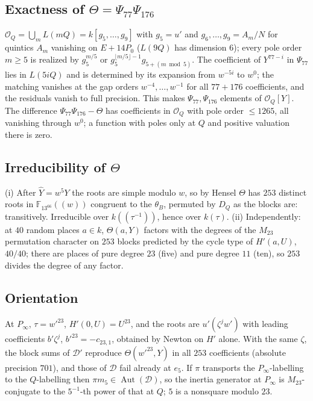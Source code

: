 \documentclass[11pt]{amsart}
\newcommand{\FF}{\mathbb{F}}
\newcommand{\Mtw}{M_{23}}
\newcommand{\Aut}{\operatorname{Aut}}
\theoremstyle{plain}
\theoremstyle{definition}
\begin{document}
\subsection*{Exactness of $\Theta=\Psi_{77}\Psi_{176}$}
$\mathcal O_Q=\bigcup_mL(mQ)=k[g_5,\dots,g_9]$ with $g_5=u'$ and
$g_6,\dots,g_9=A_m/N$ for quintics $A_m$ vanishing on $E+14P_0$
($L(9Q)$ has dimension $6$); every pole order $m\ge5$ is realized by
$g_5^{m/5}$ or $g_5^{\lfloor m/5\rfloor-1}g_{5+(m\bmod5)}$. The
coefficient of $Y^{77-i}$ in $\Psi_{77}$ lies in $L(5iQ)$ and is
determined by its expansion from $w^{-5i}$ to $w^0$; the matching
vanishes at the gap orders $w^{-4},\dots,w^{-1}$ for all $77+176$
coefficients, and the residuals vanish to full precision. This makes
$\Psi_{77},\Psi_{176}$ elements of $\mathcal O_Q[Y]$. The difference
$\Psi_{77}\Psi_{176}-\Theta$ has coefficients in $\mathcal O_Q$ with
pole order $\le1265$, all vanishing through $w^0$; a function with
poles only at $Q$ and positive valuation there is zero.

\subsection*{Irreducibility of $\Theta$}
(i) After $\hat Y=w^5Y$ the roots are simple modulo $w$, so by Hensel
$\Theta$ has $253$ distinct roots in $\FF_{13^{66}}((w))$ congruent to
the $\theta_B$, permuted by $D_Q$ as the blocks are: transitively.
Irreducible over $k((\tau^{-1}))$, hence over $k(\tau)$.
(ii) Independently: at $40$ random places $a\in k$, $\Theta(a,Y)$
factors with the degrees of the $\Mtw$ permutation character on $253$
blocks predicted by the cycle type of $H'(a,U)$, $40/40$; there are
places of pure degree $23$ (five) and pure degree $11$ (ten), so
$253$ divides the degree of any factor.

\subsection*{Orientation}
At $P_\infty$, $\tau=w'^{23}$, $H'(0,U)=U^{23}$, and the roots are
$u'(\zeta^jw')$ with leading coefficients $b'\zeta^j$, $b'^{23}=-c_{23,1}$,
obtained by Newton on $H'$ alone. With the same $\zeta$, the block sums
of $\mathcal D'$ reproduce $\Theta(w'^{23},Y)$ in all $253$
coefficients (absolute precision $701$), and those of $\mathcal D$ fail
already at $e_5$. If $\pi$ transports the $P_\infty$-labelling to the
$Q$-labelling then $\pi m_5\in\Aut(\mathcal D)$, so the inertia
generator at $P_\infty$ is $\Mtw$-conjugate to the $5^{-1}$-th power of
that at $Q$; $5$ is a nonsquare modulo $23$.
\end{document}
